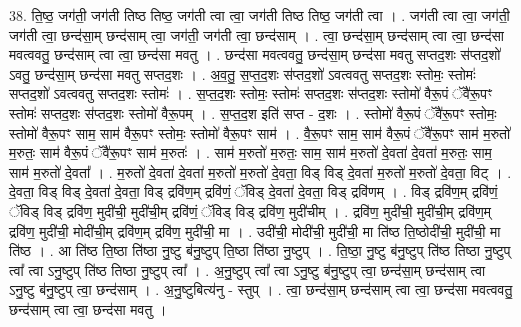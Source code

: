 \documentclass[17pt]{extarticle}
\begin{document}
38. ति॒ष्ठ॒ जग॑ती॒ जग॑ती तिष्ठ तिष्ठ॒ जग॑ती त्वा त्वा॒ जग॑ती तिष्ठ तिष्ठ॒ जग॑ती त्वा । . जग॑ती त्वा त्वा॒ जग॑ती॒ जग॑ती त्वा॒ छन्द॑सा॒म् छन्द॑साम् त्वा॒ जग॑ती॒ जग॑ती त्वा॒ छन्द॑साम् । . त्वा॒ छन्द॑सा॒म् छन्द॑साम् त्वा त्वा॒ छन्द॑सा मवत्ववतु॒ छन्द॑साम् त्वा त्वा॒ छन्द॑सा मवतु । . छन्द॑सा मवत्ववतु॒ छन्द॑सा॒म् छन्द॑सा मवतु सप्तद॒शः स॑प्तद॒शो॑ ऽवतु॒ छन्द॑सा॒म् छन्द॑सा मवतु सप्तद॒शः । . अ॒व॒तु॒ स॒प्त॒द॒शः स॑प्तद॒शो॑ ऽवत्ववतु सप्तद॒शः स्तोमः॒ स्तोमः॑ सप्तद॒शो॑ ऽवत्ववतु सप्तद॒शः स्तोमः॑ । . स॒प्त॒द॒शः स्तोमः॒ स्तोमः॑ सप्तद॒शः स॑प्तद॒शः स्तोमो॑ वैरू॒पं ॅवै॑रू॒पꣳ स्तोमः॑ सप्तद॒शः स॑प्तद॒शः स्तोमो॑ वैरू॒पम् । . स॒प्त॒द॒श इति॑ सप्त - द॒शः । . स्तोमो॑ वैरू॒पं ॅवै॑रू॒पꣳ स्तोमः॒ स्तोमो॑ वैरू॒पꣳ साम॒ साम॑ वैरू॒पꣳ स्तोमः॒ स्तोमो॑ वैरू॒पꣳ साम॑ । . वै॒रू॒पꣳ साम॒ साम॑ वैरू॒पं ॅवै॑रू॒पꣳ साम॑ म॒रुतो॑ म॒रुतः॒ साम॑ वैरू॒पं ॅवै॑रू॒पꣳ साम॑ म॒रुतः॑ । . साम॑ म॒रुतो॑ म॒रुतः॒ साम॒ साम॑ म॒रुतो॑ दे॒वता॑ दे॒वता॑ म॒रुतः॒ साम॒ साम॑ म॒रुतो॑ दे॒वता᳚ । . म॒रुतो॑ दे॒वता॑ दे॒वता॑ म॒रुतो॑ म॒रुतो॑ दे॒वता॒ विड् विड् दे॒वता॑ म॒रुतो॑ म॒रुतो॑ दे॒वता॒ विट् । . दे॒वता॒ विड् विड् दे॒वता॑ दे॒वता॒ विड् द्रवि॑ण॒म् द्रवि॑णं॒ ॅविड् दे॒वता॑ दे॒वता॒ विड् द्रवि॑णम् । . विड् द्रवि॑ण॒म् द्रवि॑णं॒ ॅविड् विड् द्रवि॑ण॒ मुदी॑ची॒ मुदी॑ची॒म् द्रवि॑णं॒ ॅविड् विड् द्रवि॑ण॒ मुदी॑चीम् । . द्रवि॑ण॒ मुदी॑ची॒ मुदी॑ची॒म् द्रवि॑ण॒म् द्रवि॑ण॒ मुदी॑ची॒ मोदी॑ची॒म् द्रवि॑ण॒म् द्रवि॑ण॒ मुदी॑ची॒ मा । . उदी॑ची॒ मोदी॑ची॒ मुदी॑ची॒ मा ति॑ष्ठ ति॒ष्ठोदी॑ची॒ मुदी॑ची॒ मा ति॑ष्ठ । . आ ति॑ष्ठ ति॒ष्ठा ति॑ष्ठा नु॒ष्टु ब॑नु॒ष्टुप् ति॒ष्ठा ति॑ष्ठा नु॒ष्टुप् । . ति॒ष्ठा॒ नु॒ष्टु ब॑नु॒ष्टुप् ति॑ष्ठ तिष्ठा नु॒ष्टुप् त्वा᳚ त्वा ऽनु॒ष्टुप् ति॑ष्ठ तिष्ठा नु॒ष्टुप् त्वा᳚ । . अ॒नु॒ष्टुप् त्वा᳚ त्वा ऽनु॒ष्टु ब॑नु॒ष्टुप् त्वा॒ छन्द॑सा॒म् छन्द॑साम् त्वा ऽनु॒ष्टु ब॑नु॒ष्टुप् त्वा॒ छन्द॑साम् । . अ॒नु॒ष्टुबित्य॑नु - स्तुप् । . त्वा॒ छन्द॑सा॒म् छन्द॑साम् त्वा त्वा॒ छन्द॑सा मवत्ववतु॒ छन्द॑साम् त्वा त्वा॒ छन्द॑सा मवतु । \newline
\pagebreak
{}
\end{document}
